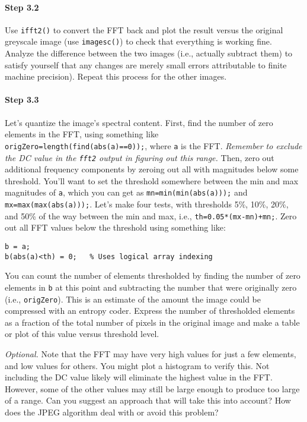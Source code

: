 \paragraph{Step 3.2} Use \verb|ifft2()| to convert the FFT back and
plot the result versus the original greyscale image (use
\verb|imagesc()|) to check that everything is working fine. Analyze
the difference between the two images (i.e., actually subtract them)
to satisfy yourself that any changes are merely small errors
attributable to finite machine precision). Repeat this process for the
other images.

\paragraph{Step 3.3} Let's quantize the image's spectral
content. First, find the number of zero elements in the FFT, using
something like \verb|origZero=length(find(abs(a)==0));|, where
\verb|a| is the FFT. \emph{Remember to exclude the DC value in the
  \texttt{fft2} output in figuring out this range.} Then, zero out
additional frequency components by zeroing out all with magnitudes
below some threshold. You'll want to set the threshold somewhere
between the min and max magnitudes of \verb|a|, which you can get as
\verb|mn=min(min(abs(a)));| and \verb|mx=max(max(abs(a)));|. Let's
make four tests, with thresholds 5\%, 10\%, 20\%, and 50\% of the way
between the min and max, i.e., \verb|th=0.05*(mx-mn)+mn;|. Zero out
all FFT values below the threshold using something like:
\begin{lstlisting}[style=Matlab-editor,basicstyle=\mlttfamily\small]
b = a;
b(abs(a)<th) = 0;   % Uses logical array indexing
\end{lstlisting}
You can count the number of elements thresholded by finding the number
of zero elements in \verb|b| at this point and subtracting the number
that were originally zero (i.e., \verb|origZero|). This is an estimate
of the amount the image could be compressed with an entropy
coder. Express the number of thresholded elements as a fraction of the
total number of pixels in the original image and make a table or plot
of this value versus threshold level.

\textit{Optional.} Note that the FFT may have very high values for
just a few elements, and low values for others. You might plot a
histogram to verify this. Not including the DC value likely will
eliminate the highest value in the FFT. However, some of the other
values may still be large enough to produce too large of a range. Can
you suggest an approach that will take this into account? How does the
JPEG algorithm deal with or avoid this problem?

